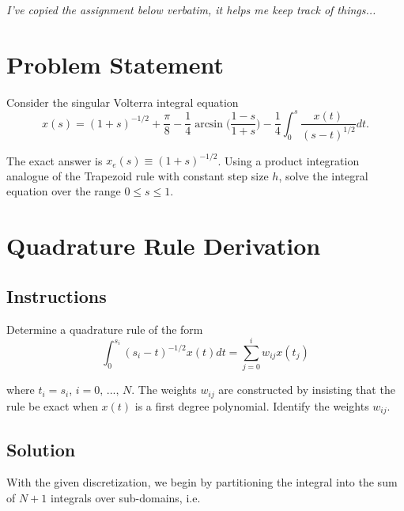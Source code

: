 \documentclass[10pt]{article}
\begin{document}

\pagestyle{fancy}
\fancyhf{}
\setlength\headheight{12pt}

\textit{I've copied the assignment below verbatim, it helps me keep track of things...}

\section*{Problem Statement}

Consider the singular Volterra integral equation
\begin{equation}
    x(s) = (1 + s)^{-1/2} + \frac{\pi}{8} - \frac{1}{4} \arcsin \Big( \frac{1 - s}{1 + s} \Big) - \frac{1}{4} \int_{0}^{s} \frac{x(t)}{(s - t)^{1/2}} dt. \label{main}
\end{equation}

The exact answer is $x_e(s) \equiv (1 + s)^{-1/2}$. Using a product integration analogue of the Trapezoid rule with constant step size $h$, solve the integral equation over the range $0 \leq s \leq 1$.

\section*{Quadrature Rule Derivation}
\subsection*{Instructions}
Determine a quadrature rule of the form
\begin{equation}
    \int_0^{s_i} (s_i - t)^{-1/2} x(t) dt = \sum_{j = 0}^i w_{ij} x(t_j)
\end{equation}

where $t_i = s_i$, $i = 0, \, ..., \, N$. The weights $w_{ij}$ are constructed by insisting that the rule be exact when $x(t)$ is a first degree polynomial. Identify the weights $w_{ij}$.

\subsection*{Solution}
With the given discretization, we begin by partitioning the integral into the sum of $N + 1$ integrals over sub-domains, i.e.
\end{document}

